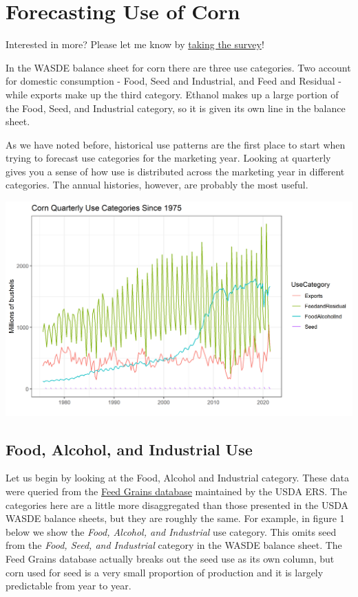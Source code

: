 \documentclass[
  letterpaper,
  DIV=11,
  numbers=noendperiod]{scrreprt}
\begin{document}

\chapter{Forecasting Use of Corn}\label{forecasting-use-of-corn}

{Interested in more? Please let me know by}
\href{https://forms.gle/Q3VByCQZHjfQSy9D7}{taking the survey}!

In the WASDE balance sheet for corn there are three use categories. Two
account for domestic consumption - Food, Seed and Industrial, and Feed
and Residual - while exports make up the third category. Ethanol makes
up a large portion of the Food, Seed, and Industrial category, so it is
given its own line in the balance sheet.

As we have noted before, historical use patterns are the first place to
start when trying to forecast use categories for the marketing year.
Looking at quarterly gives you a sense of how use is distributed across
the marketing year in different categories. The annual histories,
however, are probably the most useful.

\includegraphics{assets/ForecastingUseof-CornUseCategories.png}

\section{Food, Alcohol, and Industrial
Use}\label{food-alcohol-and-industrial-use}

Let us begin by looking at the Food, Alcohol and Industrial category.
These data were queried from the
\href{http://www.ers.usda.gov/data-products/feed-grains-database/feed-grains-yearbook-tables.aspx\#26780}{Feed
Grains database} maintained by the USDA ERS. The categories here are a
little more disaggregated than those presented in the USDA WASDE balance
sheets, but they are roughly the same. For example, in figure 1 below we
show the \emph{Food, Alcohol, and Industrial} use category. This omits
seed from the \emph{Food, Seed, and Industrial} category in the WASDE
balance sheet. The Feed Grains database actually breaks out the seed use
as its own column, but corn used for seed is a very small proportion of
production and it is largely predictable from year to year.
\end{document}

